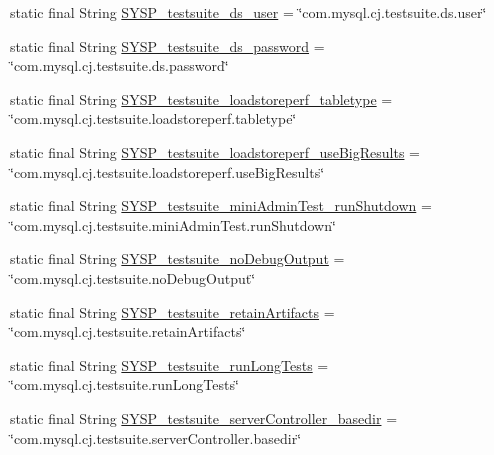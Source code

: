 \begin{DoxyCompactItemize}
\item 
static final String \mbox{\hyperlink{classcom_1_1mysql_1_1cj_1_1conf_1_1_property_definitions_ae4cdcee271105367eda30b5c691cf988}{S\+Y\+S\+P\+\_\+testsuite\+\_\+ds\+\_\+user}} = \char`\"{}com.\+mysql.\+cj.\+testsuite.\+ds.\+user\char`\"{}
\item 
static final String \mbox{\hyperlink{classcom_1_1mysql_1_1cj_1_1conf_1_1_property_definitions_adaf6e39198f7e89b2ffeecd7a858264d}{S\+Y\+S\+P\+\_\+testsuite\+\_\+ds\+\_\+password}} = \char`\"{}com.\+mysql.\+cj.\+testsuite.\+ds.\+password\char`\"{}
\item 
static final String \mbox{\hyperlink{classcom_1_1mysql_1_1cj_1_1conf_1_1_property_definitions_aab81041451c76ee27e6153d8571b95e2}{S\+Y\+S\+P\+\_\+testsuite\+\_\+loadstoreperf\+\_\+tabletype}} = \char`\"{}com.\+mysql.\+cj.\+testsuite.\+loadstoreperf.\+tabletype\char`\"{}
\item 
static final String \mbox{\hyperlink{classcom_1_1mysql_1_1cj_1_1conf_1_1_property_definitions_a9f10b1012a4ea03e4b680add5d6bd700}{S\+Y\+S\+P\+\_\+testsuite\+\_\+loadstoreperf\+\_\+use\+Big\+Results}} = \char`\"{}com.\+mysql.\+cj.\+testsuite.\+loadstoreperf.\+use\+Big\+Results\char`\"{}
\item 
static final String \mbox{\hyperlink{classcom_1_1mysql_1_1cj_1_1conf_1_1_property_definitions_a53831bb7eefb09a7489e8d70576f91c5}{S\+Y\+S\+P\+\_\+testsuite\+\_\+mini\+Admin\+Test\+\_\+run\+Shutdown}} = \char`\"{}com.\+mysql.\+cj.\+testsuite.\+mini\+Admin\+Test.\+run\+Shutdown\char`\"{}
\item 
static final String \mbox{\hyperlink{classcom_1_1mysql_1_1cj_1_1conf_1_1_property_definitions_abd7660a7281ae9d5070760e1b69769a3}{S\+Y\+S\+P\+\_\+testsuite\+\_\+no\+Debug\+Output}} = \char`\"{}com.\+mysql.\+cj.\+testsuite.\+no\+Debug\+Output\char`\"{}
\item 
static final String \mbox{\hyperlink{classcom_1_1mysql_1_1cj_1_1conf_1_1_property_definitions_ac945001cda21055ae2127bf8f5fad45d}{S\+Y\+S\+P\+\_\+testsuite\+\_\+retain\+Artifacts}} = \char`\"{}com.\+mysql.\+cj.\+testsuite.\+retain\+Artifacts\char`\"{}
\item 
static final String \mbox{\hyperlink{classcom_1_1mysql_1_1cj_1_1conf_1_1_property_definitions_acc468685036d517e9e596f67d637b781}{S\+Y\+S\+P\+\_\+testsuite\+\_\+run\+Long\+Tests}} = \char`\"{}com.\+mysql.\+cj.\+testsuite.\+run\+Long\+Tests\char`\"{}
\item 
static final String \mbox{\hyperlink{classcom_1_1mysql_1_1cj_1_1conf_1_1_property_definitions_a4f8ef158fd6ec92b5282565006818f69}{S\+Y\+S\+P\+\_\+testsuite\+\_\+server\+Controller\+\_\+basedir}} = \char`\"{}com.\+mysql.\+cj.\+testsuite.\+server\+Controller.\+basedir\char`\"{}

\end{DoxyCompactItemize}
